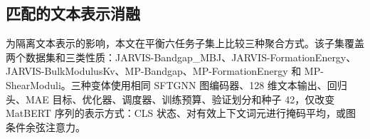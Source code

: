 \documentclass[a4paper,fleqn]{cas-sc}
\begin{document}
\begin{table}[pos=H]\caption{不同协议下 Materials Project 上的文献参照比较。形成能单位为 eV/atom，带隙为 eV，弹性模量为 $\log_{10}(\mathrm{GPa})$。已发表数值沿用各研究的评估协议；粗体和下划线仅用于列内视觉参照，不表示协议匹配的跨研究排名。}\label{tab:mp_lit}\centering\scriptsize
{}\end{table}

\subsection{匹配的文本表示消融}
为隔离文本表示的影响，本文在平衡六任务子集上比较三种聚合方式。该子集覆盖两个数据集和三类性质：JARVIS-Bandgap\_MBJ、JARVIS-FormationEnergy、JARVIS-BulkModulusKv、MP-Bandgap、MP-FormationEnergy 和 MP-ShearModuli。三种变体使用相同 SFTGNN 图编码器、128 维文本输出、回归头、MAE 目标、优化器、调度器、训练预算、验证划分和种子 42，仅改变 MatBERT 序列的表示方式：CLS 状态、对有效上下文词元进行掩码平均，或图条件余弦注意力。
\end{document}
